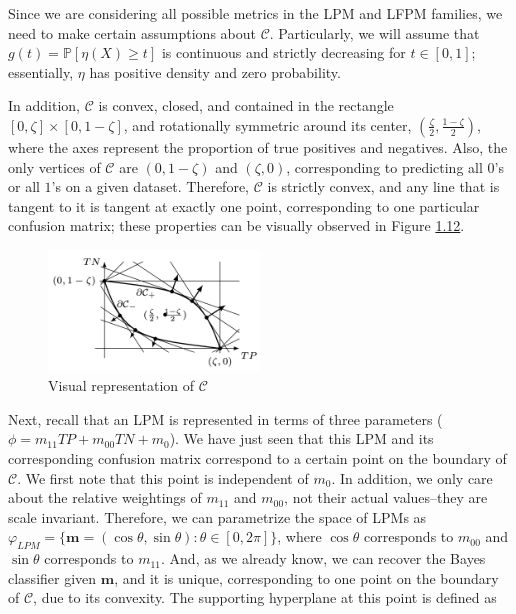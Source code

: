 \documentclass[
  letterpaper,
  DIV=11,
  numbers=noendperiod,
  oneside]{scrreprt}
\theoremstyle{remark}
\begin{document}
Since we are considering all possible metrics in the LPM and LFPM
families, we need to make certain assumptions about \(\mathcal{C}\).
Particularly, we will assume that \(g(t) = \mathbb{P}[\eta(X) \geq t]\)
is continuous and strictly decreasing for \(t \in [0, 1]\); essentially,
\(\eta\) has positive density and zero probability.

In addition, \(\mathcal{C}\) is convex, closed, and contained in the
rectangle \([0, \zeta] \times[0,1-\zeta]\), and rotationally symmetric
around its center, \((\frac{\zeta}{2}, \frac{1-\zeta}{2})\), where the
axes represent the proportion of true positives and negatives. Also, the
only vertices of \(\mathcal{C}\) are \((0,1-\zeta)\) and \((\zeta, 0)\),
corresponding to predicting all \(0\)'s or all \(1\)'s on a given
dataset. Therefore, \(\mathcal{C}\) is strictly convex, and any line
that is tangent to it is tangent at exactly one point, corresponding to
one particular confusion matrix; these properties can be visually
observed in Figure \hyperref[fig:c]{1.12}.

\begin{figure}

{\centering \includegraphics[width=0.5\textwidth,height=\textheight]{src/Figures/Screenshot 2023-11-13 at 6.56.44 PM.png}

}

\caption{Visual representation of \(\mathcal{C}\)}

\end{figure}%

Next, recall that an LPM is represented in terms of three parameters
(\(\phi = m_{11}TP + m_{00}TN + m_0\)). We have just seen that this LPM
and its corresponding confusion matrix correspond to a certain point on
the boundary of \(\mathcal{C}\). We first note that this point is
independent of \(m_0\). In addition, we only care about the relative
weightings of \(m_{11}\) and \(m_{00}\), not their actual values--they
are scale invariant. Therefore, we can parametrize the space of LPMs as
\(\varphi_{L P M}=\{\mathbf{m}=(\cos \theta, \sin \theta): \theta \in[0,2 \pi]\}\),
where \(\cos \theta\) corresponds to \(m_{00}\) and \(\sin \theta\)
corresponds to \(m_{11}\). And, as we already know, we can recover the
Bayes classifier given \(\mathbf{m}\), and it is unique, corresponding
to one point on the boundary of \(\mathcal{C}\), due to its convexity.
The supporting hyperplane at this point is defined as
\end{document}
